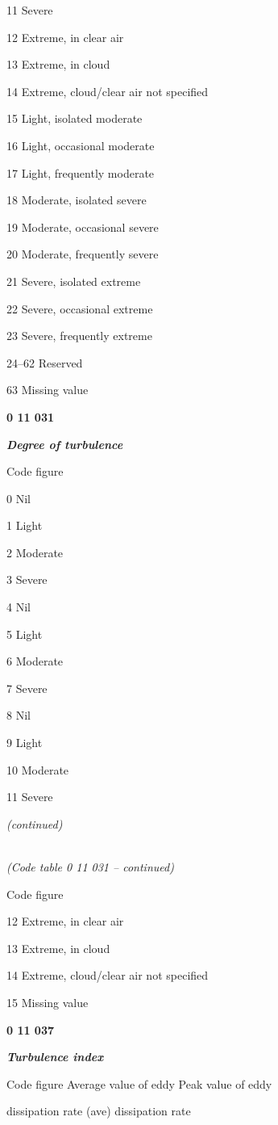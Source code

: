 11 Severe

12 Extreme, in clear air

13 Extreme, in cloud

14 Extreme, cloud/clear air not specified

15 Light, isolated moderate

16 Light, occasional moderate

17 Light, frequently moderate

18 Moderate, isolated severe

19 Moderate, occasional severe

20 Moderate, frequently severe

21 Severe, isolated extreme

22 Severe, occasional extreme

23 Severe, frequently extreme

24--62 Reserved

63 Missing value

\textbf{0 11 031}

\emph{\textbf{Degree of turbulence}}

Code figure

0 Nil

1 Light

2 Moderate

3 Severe

4 Nil

5 Light

6 Moderate

7 Severe

8 Nil

9 Light

10 Moderate

11 Severe

\emph{(continued)}

\emph{\\
(Code table 0 11 031 -- continued)}

Code figure

12 Extreme, in clear air

13 Extreme, in cloud

14 Extreme, cloud/clear air not specified

15 Missing value

\textbf{0 11 037}

\emph{\textbf{Turbulence index}}

Code figure Average value of eddy Peak value of eddy

dissipation rate (ave) dissipation rate

